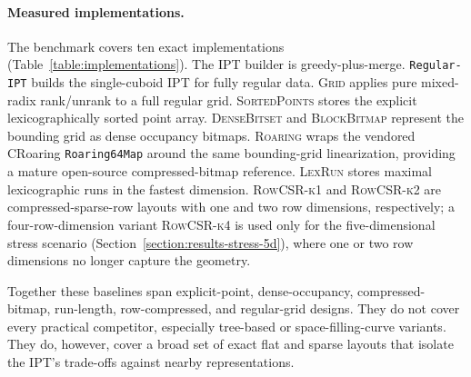 \documentclass[manuscript,screen,review]{acmart}
\theoremstyle{definition}
\theoremstyle{plain}
\begin{document}
\paragraph{Measured implementations.}
The benchmark covers ten exact implementations
(Table~\ref{table:implementations}). The IPT builder is
greedy-plus-merge. \texttt{Regular-IPT} builds the single-cuboid IPT
for fully regular data. \textsc{Grid} applies
pure mixed-radix rank/unrank to a full regular grid. \textsc{SortedPoints}
stores the explicit lexicographically sorted point array. \textsc{DenseBitset}
and \textsc{BlockBitmap} represent the bounding grid as dense occupancy
bitmaps. \textsc{Roaring} wraps the vendored CRoaring \texttt{Roaring64Map}
around the same bounding-grid linearization, providing a mature
open-source compressed-bitmap reference. \textsc{LexRun} stores maximal
lexicographic runs in the fastest dimension. \textsc{RowCSR-k1} and
\textsc{RowCSR-k2} are compressed-sparse-row layouts with one and two row
dimensions, respectively; a four-row-dimension variant
\textsc{RowCSR-k4} is used only for the five-dimensional stress
scenario (Section~\ref{section:results-stress-5d}), where one or two
row dimensions no longer capture the geometry.

Together these baselines span explicit-point, dense-occupancy,
compressed-bitmap, run-length, row-compressed, and regular-grid designs.
They do not cover every practical competitor, especially tree-based or
space-filling-curve variants. They do, however, cover a broad set of
exact flat and sparse layouts that isolate the IPT's trade-offs
against nearby representations.
\end{document}
